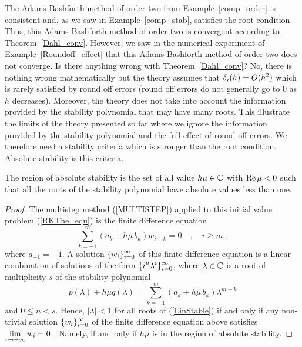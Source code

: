 \begin{rmk}
The Adams-Bashforth method of order two from Example~\ref{comp_order} is
consistent and, as we saw in Example~\ref{comp_stab}, satisfies the
root condition.   Thus, this Adams-Bashforth method of order two is
convergent according to Theorem~\ref{Dahl_conv}.  However, we saw in the
numerical experiment of Example~\ref{Roundoff_effect} that this
Adams-Bashforth method of order two does not converge.  Is there
anything wrong with Theorem~\ref{Dahl_conv}?  No, there is nothing wrong
mathematically but the theory assumes that $\displaystyle \delta_i(h) = O(h^2)$
which is rarely satisfied by round off errors (round off errors
do not generally go to $0$ as $h$ decreases).  Moreover, the theory
does not take into account the information provided by the stability
polynomial that may have many roots.  This illustrate the limits
of the theory presented so far where we ignore the information
provided by the stability polynomial and the full effect of round off
errors.   We therefore need a stability criteria which is stronger
than the root condition.  Absolute stability is this criteria.
\end{rmk}

\begin{prop}
The region of absolute stability is the set of all value
$h\mu \in \mathbb{C}$ with $\operatorname{Re} \mu < 0$ such that
all the roots of the stability polynomial have absolute
values less than one.
\end{prop}

\begin{proof}
The multistep method (\ref{MULTISTEP}) applied to this initial value
problem (\ref{RKThe_equ}) is the finite difference equation
\[
\sum_{k=-1}^m (a_k + h\mu\,b_k) w_{i-k} = 0 \quad , \quad i \geq m \ ,
\]
where $a_{-1} = -1$.  A solution
$\displaystyle \{w_i\}_{i=0}^\infty$ of this finite difference
equation is a linear combination of solutions of the form
$\displaystyle \{i^n\lambda^i\}_{i=0}^\infty$,
where $\lambda \in \mathbb{C}$ is a root of multiplicity $s$ of the stability
polynomial
\begin{equation}\label{LinStable}
p(\lambda) + h\mu q(\lambda)
= \sum_{k=-1}^m (a_k + h\mu\, b_k) \lambda^{m-k}
\end{equation}
and $0 \leq n <s$.  Hence, $|\lambda| <1$ for all roots of (\ref{LinStable})
if and only if any non-trivial solution $\displaystyle \{w_i\}_{i=0}^\infty$ of
the finite difference equation above
satisfies $\displaystyle \lim_{i\rightarrow +\infty} w_i = 0$ .  Namely,
if and only if $h\mu$ is in the region of absolute stability.
\end{proof}

